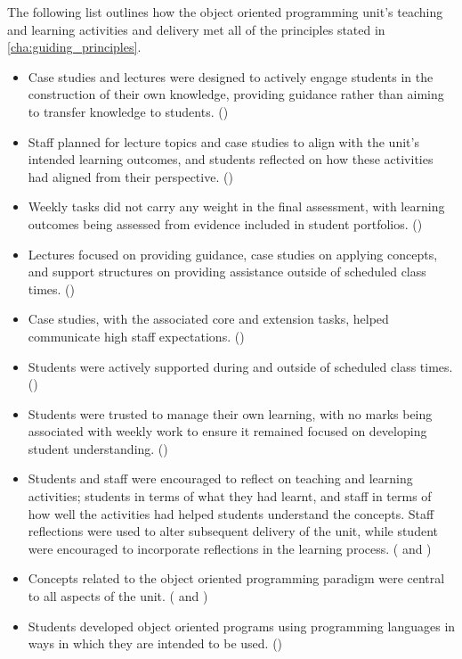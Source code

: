 The following list outlines how the object oriented programming unit's teaching and learning activities and delivery met all of the principles stated in \cref{cha:guiding_principles}.
\begin{itemize}[noitemsep,nolistsep]
	\item Case studies and lectures were designed to actively engage students in the construction of their own knowledge, providing guidance rather than aiming to transfer knowledge to students. ()
	\item Staff planned for lecture topics and case studies to align with the unit's intended learning outcomes, and students reflected on how these activities had aligned from their perspective. ()
	\item Weekly tasks did not carry any weight in the final assessment, with learning outcomes being assessed from evidence included in student portfolios. ()
	\item Lectures focused on providing guidance, case studies on applying concepts, and support structures on providing assistance outside of scheduled class times. ()
	\item Case studies, with the associated core and extension tasks, helped communicate high staff expectations. ()
	\item Students were actively supported during and outside of scheduled class times. ()
	\item Students were trusted to manage their own learning, with no marks being associated with weekly work to ensure it remained focused on developing student understanding. ()
	\item Students and staff were encouraged to reflect on teaching and learning activities; students in terms of what they had learnt, and staff in terms of how well the activities had helped students understand the concepts. Staff reflections were used to alter subsequent delivery of the unit, while student were encouraged to incorporate reflections in the learning process. ( and )
	\item Concepts related to the object oriented programming paradigm were central to all aspects of the unit. ( and )
	\item Students developed object oriented programs using programming languages in ways in which they are intended to be used. ()
\end{itemize}


